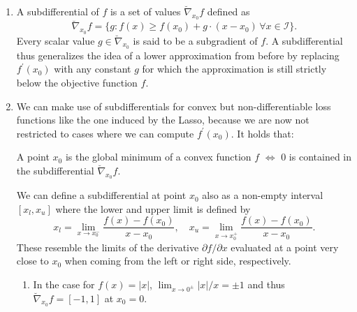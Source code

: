 \documentclass[a4paper]{article}
\makeatletter
\def\maxwidth{ %
  \ifdim\Gin@nat@width>\linewidth
    \linewidth
  \else
    \Gin@nat@width
  \fi
}
\newcommand{\hlnum}[1]{\textcolor[rgb]{0.686,0.059,0.569}{#1}}%
\newcommand{\hlstr}[1]{\textcolor[rgb]{0.192,0.494,0.8}{#1}}%
\newcommand{\hlopt}[1]{\textcolor[rgb]{0,0,0}{#1}}%
\newcommand{\hlstd}[1]{\textcolor[rgb]{0.345,0.345,0.345}{#1}}%
\newcommand{\hlkwa}[1]{\textcolor[rgb]{0.161,0.373,0.58}{\textbf{#1}}}%
\newcommand{\hlkwc}[1]{\textcolor[rgb]{0.333,0.667,0.333}{#1}}%
\newcommand{\hlkwd}[1]{\textcolor[rgb]{0.737,0.353,0.396}{\textbf{#1}}}%
\newenvironment{kframe}{%
 \def\at@end@of@kframe{}%
 \ifinner\ifhmode%
  \def\at@end@of@kframe{\end{minipage}}%
  \begin{minipage}{\columnwidth}%
 \fi\fi%
 \def\FrameCommand##1{\hskip\@totalleftmargin \hskip-\fboxsep
 \colorbox{shadecolor}{##1}\hskip-\fboxsep
     \hskip-\linewidth \hskip-\@totalleftmargin \hskip\columnwidth}%
 \MakeFramed {\advance\hsize-\width
   \@totalleftmargin\z@ \linewidth\hsize
   \@setminipage}}%
 {\par\unskip\endMakeFramed%
 \at@end@of@kframe}
\newenvironment{knitrout}{}{} %
\makeatother
\begin{document}
{\begin{enumerate}
\begin{knitrout}
\begin{kframe}
\begin{alltt}
\hlkwd{plot}\hlstd{(xx, yy,} \hlkwc{type} \hlstd{=} \hlstr{"l"}\hlstd{,} \hlkwc{xlab} \hlstd{=} \hlstr{"x"}\hlstd{,} \hlkwc{ylab} \hlstd{=} \hlstr{"f(x)"}\hlstd{,} \hlkwc{ylim}\hlstd{=}\hlkwd{c}\hlstd{(}\hlopt{-}\hlnum{4}\hlstd{,}\hlnum{10}\hlstd{),} \hlkwc{col} \hlstd{=}\hlstr{"red"}\hlstd{,} \hlkwc{lwd}\hlstd{=}\hlnum{2.5}\hlstd{)}
\hlkwa{for}\hlstd{(x0} \hlkwa{in} \hlkwd{seq}\hlstd{(}\hlopt{-}\hlnum{2}\hlstd{,}\hlnum{2}\hlstd{,}\hlkwc{by}\hlstd{=}\hlnum{0.5}\hlstd{))}
  \hlkwd{abline}\hlstd{(}\hlkwd{approx_fun}\hlstd{(x0),} \hlkwc{col} \hlstd{=} \hlkwd{rgb}\hlstd{(}\hlnum{0}\hlstd{,}\hlnum{0}\hlstd{,}\hlnum{0}\hlstd{,}\hlnum{0.5}\hlstd{))}
\end{alltt}
\end{kframe}
\texttt{[image: figure/unnamed-chunk-2-1]} 
\end{knitrout}
  \item A subdifferential of $f$ is a set of values $\breve{\nabla}_{x_0} f$ defined as $$\breve{\nabla}_{x_0} f = \{ g: f(x) \geq f(x_0) + g \cdot (x-x_0) \, \forall x \in \mathcal{I} \}.$$ Every scalar value $g \in \breve{\nabla}_{x_0}$ is said to be a subgradient of $f$.  A subdifferential thus generalizes the idea of a lower approximation from before by replacing $f^\prime(x_0)$ with any constant $g$ for which the approximation is still strictly below the objective function $f$.
  \item We can make use of subdifferentials for convex but non-differentiable loss functions like the one induced by the Lasso, because we are now not restricted to cases where we can compute $f^\prime(x_0)$. It holds that:\\
  \begin{center}
  A point $x_0$ is the global minimum of a convex function $f$ $\Leftrightarrow$ $0$ is contained in the subdifferential $\breve{\nabla}_{x_0} f$.\\
  \end{center}
  We can define a subdifferential at point $x_0$ also as a non-empty interval $[x_l,x_u]$ where the lower and upper limit is defined by $$x_l = \lim_{x \to x_0^{-}} \frac{f(x)-f(x_0)}{x-x_0}, \quad x_u = \lim_{x \to x_0^{+}} \frac{f(x)-f(x_0)}{x-x_0}.$$ These resemble the limits of the derivative $\partial f / \partial x$ evaluated at a point very close to $x_0$ when coming from the left or right side, respectively. 
  \begin{enumerate}
  \item In the case for $f(x) = |x|$, $\lim_{x\to 0^{\pm}} |x|/x = \pm 1$ and thus $\breve{\nabla}_{x_0} f = [-1,1]$ at $x_0 = 0$.

\end{enumerate}
\end{enumerate}}
\end{document}
